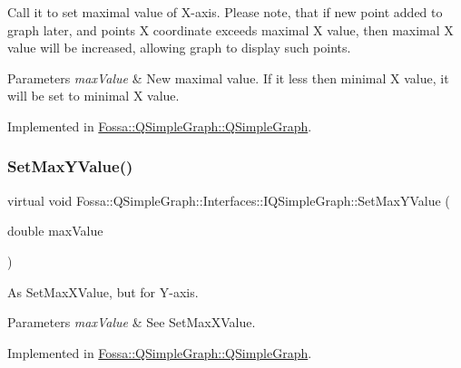Call it to set maximal value of X-\/axis. Please note, that if new point added to graph later, and point\textquotesingle{}s X coordinate exceeds maximal X value, then maximal X value will be increased, allowing graph to display such points. 


\begin{DoxyParams}{Parameters}
{\em max\+Value} & New maximal value. If it less then minimal X value, it will be set to minimal X value. \\
\hline
\end{DoxyParams}


Implemented in \hyperlink{class_fossa_1_1_q_simple_graph_1_1_q_simple_graph_a568a2dea4e0307b6888aaa048b4da97a}{Fossa\+::\+Q\+Simple\+Graph\+::\+Q\+Simple\+Graph}.

\mbox{\label{class_fossa_1_1_q_simple_graph_1_1_interfaces_1_1_i_q_simple_graph_a09e04c116810e79ca1663d2075477746}} 
\subsubsection{\texorpdfstring{Set\+Max\+Y\+Value()}{SetMaxYValue()}}
{\footnotesize\ttfamily virtual void Fossa\+::\+Q\+Simple\+Graph\+::\+Interfaces\+::\+I\+Q\+Simple\+Graph\+::\+Set\+Max\+Y\+Value (\begin{DoxyParamCaption}\item[{double}]{max\+Value }\end{DoxyParamCaption})\hspace{0.3cm}{\ttfamily [pure virtual]}}



As Set\+Max\+X\+Value, but for Y-\/axis. 


\begin{DoxyParams}{Parameters}
{\em max\+Value} & See Set\+Max\+X\+Value. \\
\hline
\end{DoxyParams}


Implemented in \hyperlink{class_fossa_1_1_q_simple_graph_1_1_q_simple_graph_a6cb6eee80dc489f300e32263833cf1cd}{Fossa\+::\+Q\+Simple\+Graph\+::\+Q\+Simple\+Graph}.

